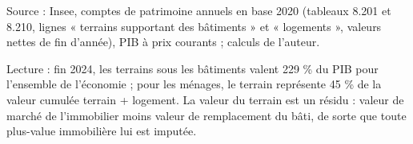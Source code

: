 Source : Insee, comptes de patrimoine annuels en base 2020 (tableaux 8.201 et 8.210, lignes « terrains supportant des bâtiments » et « logements », valeurs nettes de fin d'année), PIB à prix courants ; calculs de l'auteur.\par Lecture : fin 2024, les terrains sous les bâtiments valent 229 \% du PIB pour l'ensemble de l'économie ; pour les ménages, le terrain représente 45 \% de la valeur cumulée terrain + logement. La valeur du terrain est un résidu : valeur de marché de l'immobilier moins valeur de remplacement du bâti, de sorte que toute plus-value immobilière lui est imputée.
